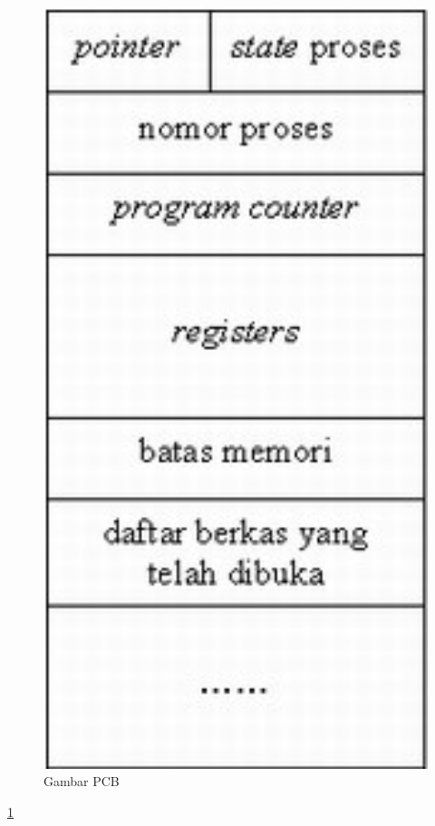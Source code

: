 	\begin{figure} [ht]
	\centerline{\includegraphics[width=1\textwidth]{figures/pcb.jpg}}
	\caption{Gambar PCB}
	\label{pcb}
	\end{figure}
	
	\ref{pcb}
	

